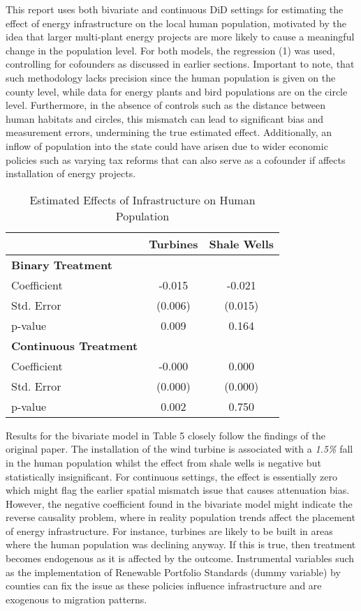 \documentclass{article}
\begin{document}
This report uses both bivariate and continuous DiD settings for estimating the effect of energy infrastructure on the local human population, motivated by the idea that larger multi-plant energy projects are more likely to cause a meaningful change in the population level. For both models, the regression (1) was used, controlling for cofounders as discussed in earlier sections. Important to note, that such methodology lacks precision since the human population is given on the county level, while data for energy plants and bird populations are on the circle level. Furthermore, in the absence of controls such as the distance between human habitats and circles, this mismatch can lead to significant bias and measurement errors, undermining the true estimated effect. Additionally, an inflow of population into the state could have arisen due to wider economic policies such as varying tax reforms that can also serve as a cofounder if affects installation of energy projects.

\begin{table}[H]
\centering
\caption{Estimated Effects of Infrastructure on Human Population}
\begin{tabular}{lcc}
\toprule
 & \textbf{Turbines} & \textbf{Shale Wells} \\
\midrule
\textbf{Binary Treatment} \\
Coefficient & -0.015 & -0.021 \\
Std. Error  & (0.006) & (0.015) \\
p-value     & 0.009 & 0.164 \\
\addlinespace
\textbf{Continuous Treatment} \\
Coefficient & -0.000 & 0.000 \\
Std. Error  & (0.000) & (0.000) \\
p-value     & 0.002 & 0.750 \\
\bottomrule
\end{tabular}
\end{table}


\addlinespace

Results for the bivariate model in Table 5 closely follow the findings of the original paper. The installation of the wind turbine is associated with a \textit{1.5\%} fall in the human population whilst the effect from shale wells is negative but statistically insignificant. For continuous settings, the effect is essentially zero which might flag the earlier spatial mismatch issue that causes attenuation bias. However, the negative coefficient found in the bivariate model might indicate the reverse causality problem, where in reality population trends affect the placement of energy infrastructure. For instance, turbines are likely to be built in areas where the human population was declining anyway. If this is true, then treatment becomes endogenous as it is affected by the outcome. Instrumental variables such as the implementation of Renewable Portfolio Standards (dummy variable) by counties can fix the issue as these policies influence infrastructure and are exogenous to migration patterns. 
\end{document}
